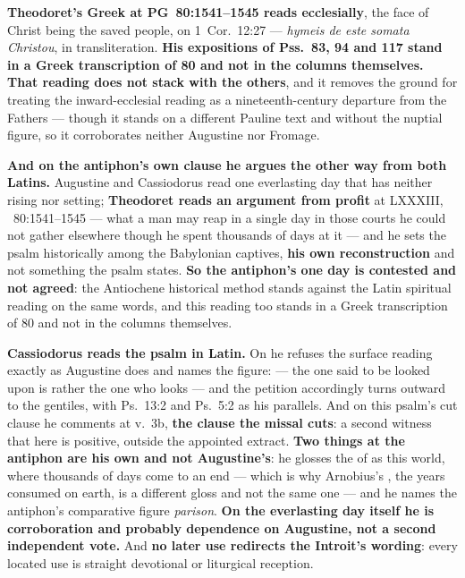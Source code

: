 \textbf{Theodoret's Greek at PG~80:1541--1545 reads  ecclesially}, the face of Christ being the saved people, on
1~Cor.~12:27 ---
\emph{hymeis de este somata Christou}, in transliteration. \textbf{His
expositions of Pss.~83, 94 and 117 stand in a Greek transcription of
 80 and not in the columns themselves.} \textbf{That reading
does not stack with the others}, and it removes the ground for treating the
inward-ecclesial reading as a nineteenth-century departure from the Fathers ---
though it stands on a different Pauline text and without the nuptial figure, so
it corroborates neither Augustine nor Fromage.

\textbf{And on the antiphon's own clause he argues the other way from both
Latins.} Augustine and Cassiodorus read one everlasting day that has neither
rising nor setting; \textbf{Theodoret reads an argument from profit} at
 LXXXIII, ~80:1541--1545 ---
what a man may reap in a single day in those courts he could not gather
elsewhere though he spent thousands of days at it --- and he sets the psalm
historically among the Babylonian captives, \textbf{his own reconstruction} and
not something the psalm states. \textbf{So the antiphon's one day is contested
and not agreed}: the Antiochene historical method stands against the Latin
spiritual reading on the same words, and this reading too stands in a Greek
transcription of  80 and not in the columns themselves.

\textbf{Cassiodorus reads the psalm in Latin.} On  he refuses the
surface reading exactly as Augustine does and names the figure:  --- the one said to be looked upon is rather the one who looks ---
and the petition accordingly turns outward to the gentiles, with Ps.~13:2 and
Ps.~5:2 as his parallels. And on this
psalm's cut clause  he comments at v.~3b,
\textbf{the clause the missal cuts}: a second witness that  here is
positive, outside the appointed extract. \textbf{Two things at the antiphon are
his own and not Augustine's}: he glosses the  of  as this world, where thousands of days come to an end --- which is why
Arnobius's , the years consumed on earth, is a different gloss and
not the same one --- and he names the antiphon's comparative figure
\emph{parison}. \textbf{On the everlasting day itself he is
corroboration and probably dependence on Augustine, not a second independent
vote.} And \textbf{no later use redirects the Introit's wording}: every located use is
straight devotional or liturgical reception.

